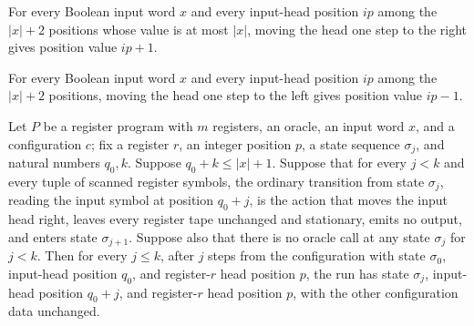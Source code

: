 \begin{lemma}
\label{Complexity.LogProg.moveInputPos_pos_val}
\leanok
{}
For every Boolean input word $x$ and every input-head position $ip$ among the $|x|+2$
positions whose value is at most $|x|$, moving the head one step to the right gives
position value $ip+1$.
\end{lemma}

\begin{lemma}
\label{Complexity.LogProg.moveInputPos_neg_val'}
\leanok
{}
For every Boolean input word $x$ and every input-head position $ip$ among the $|x|+2$
positions, moving the head one step to the left gives position value $ip-1$.
\end{lemma}

\begin{lemma}
\label{Complexity.LogProg.scanR}
\leanok
{}
Let $P$ be a register program with $m$ registers, an oracle, an input word $x$, and a
configuration $c$; fix a register $r$, an integer position $p$, a state sequence
$\sigma_j$, and natural numbers $q_0,k$. Suppose $q_0+k\le |x|+1$. Suppose that for
every $j<k$ and every tuple of scanned register symbols, the ordinary transition from
state $\sigma_j$, reading the input symbol at position $q_0+j$, is the action that moves
the input head right, leaves every register tape unchanged and stationary, emits no
output, and enters state $\sigma_{j+1}$. Suppose also that there is no oracle call at
any state $\sigma_j$ for $j<k$. Then for every $j\le k$, after $j$ steps from the
configuration with state $\sigma_0$, input-head position $q_0$, and register-$r$ head
position $p$, the run has state $\sigma_j$, input-head position $q_0+j$, and
register-$r$ head position $p$, with the other configuration data unchanged.
\end{lemma}

